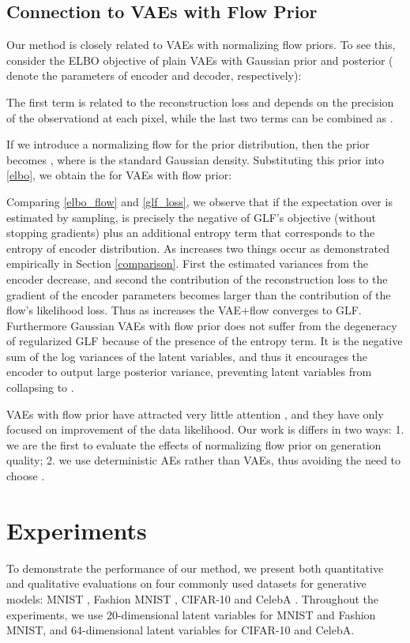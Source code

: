 \documentclass{article}
\begin{document}
\subsection{Connection to VAEs with Flow Prior} \label{connect}
Our method is closely related to VAEs with normalizing flow priors. To see this, consider the ELBO objective of plain VAEs with Gaussian prior and posterior ( denote the parameters of encoder and decoder, respectively):

The first term is related to the reconstruction loss and depends on the precision  of the observationd at each pixel, while the last two terms can be combined as . 

If we introduce a normalizing flow  for the prior distribution, then the prior  becomes , where  is the standard Gaussian density. Substituting this prior into \eqref{elbo}, we obtain the  for VAEs with flow prior:


Comparing \eqref{elbo_flow} and \eqref{glf_loss}, we observe that if the expectation over  is estimated by sampling,  is precisely the negative of GLF's objective (without stopping gradients) plus an additional entropy term that corresponds to the entropy of encoder distribution. As  increases two things occur as demonstrated empirically in Section \ref{comparison}.
First the estimated variances from the encoder decrease, and second the contribution of the reconstruction loss
to the gradient of the encoder parameters becomes larger than the contribution of the flow's likelihood loss.
Thus as  increases the VAE+flow converges to GLF. Furthermore Gaussian VAEs with flow prior does not suffer from the degeneracy of regularized GLF
because of the presence of the entropy term. It is the negative sum of the log variances of the latent variables, and thus it encourages the encoder to output large posterior variance, preventing latent variables from collapsing to . 



VAEs with flow prior have attracted very little attention \citep{explicit}, and they have only focused on improvement of the data likelihood. Our work is differs in two ways: 1.  we are the first to evaluate the effects of normalizing flow prior on generation quality; 2. we use deterministic AEs rather than VAEs, thus avoiding the need to choose .


\section{Experiments}\label{experiment}
To demonstrate the performance of our method, we present both quantitative and qualitative evaluations on four commonly used datasets for generative models: MNIST \citep{MNIST}, Fashion MNIST \citep{fashion}, CIFAR-10 \citep{CIFAR} and CelebA \citep{CELEB}. Throughout the experiments, we use 20-dimensional latent variables for MNIST and Fashion MNIST, and 64-dimensional latent variables for CIFAR-10 and CelebA. 
\end{document}
